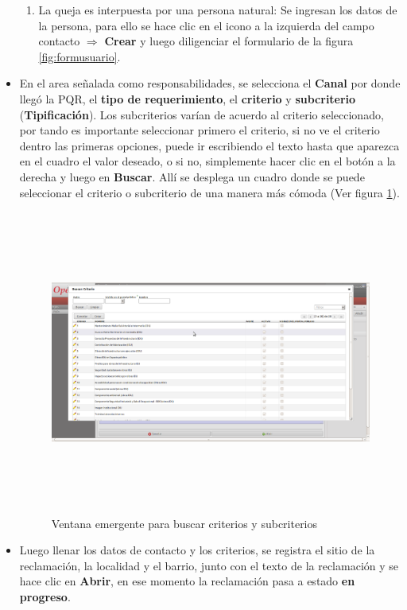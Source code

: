 \begin{itemize}
\begin{enumerate}
  \item La queja es interpuesta por una persona natural: Se ingresan los datos de la persona, para ello se hace clic en el icono a la izquierda  
  del campo contacto $\Rightarrow$ \textbf{Crear} y luego diligenciar el formulario de la figura \ref{fig:formusuario}.
 \end{enumerate}
 \item En el area señalada como responsabilidades, se selecciona el \textbf{Canal} por donde llegó la PQR, el \textbf{tipo de requerimiento},
 el \textbf{criterio} y \textbf{subcriterio} (\textbf{Tipificación}). Los subcriterios varían de acuerdo al criterio seleccionado, por tando es importante seleccionar
 primero el criterio, si no ve el criterio dentro las primeras opciones, puede ir escribiendo el texto hasta que aparezca en el cuadro el valor deseado, o 
 si no, simplemente hacer clic en el botón a la derecha y luego en \textbf{Buscar}. Allí se desplega un cuadro donde se puede seleccionar
 el criterio o subcriterio de una manera más cómoda (Ver figura \ref{fig:buscarcriterios}).
  \begin{figure}
  \centering
  \includegraphics[width=17cm,height=10cm]{./Imagenes/buscarcriterios.png}
  \caption{Ventana emergente para buscar criterios y subcriterios}
  \label{fig:buscarcriterios}
  \end{figure}
 
 
 \item Luego llenar los datos de contacto y los criterios, 
 se registra el sitio de la reclamación, la localidad y el barrio, junto con
 el texto de la reclamación y se hace clic en \textbf{Abrir}, en ese momento la reclamación pasa a estado \textbf{en progreso}.
\end{itemize}

